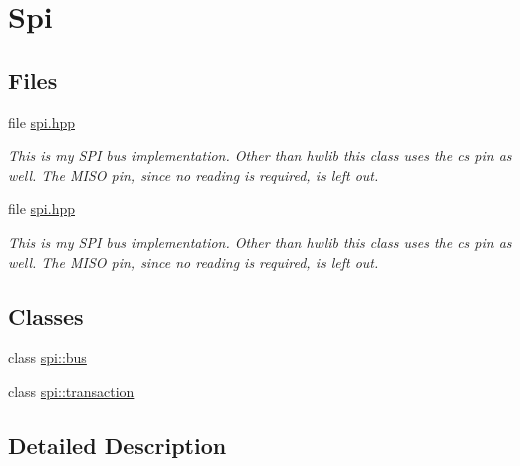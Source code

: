 \hypertarget{group__spi}{}\section{Spi}
\label{group__spi}
\subsection*{Files}
\begin{DoxyCompactItemize}
\item 
file \hyperlink{spi_8hpp}{spi.\+hpp}
\begin{DoxyCompactList}\small\item\em This is my S\+PI bus implementation. Other than hwlib this class uses the cs pin as well. The M\+I\+SO pin, since no reading is required, is left out. \end{DoxyCompactList}\item 
file \hyperlink{spi_8hpp}{spi.\+hpp}
\begin{DoxyCompactList}\small\item\em This is my S\+PI bus implementation. Other than hwlib this class uses the cs pin as well. The M\+I\+SO pin, since no reading is required, is left out. \end{DoxyCompactList}\end{DoxyCompactItemize}
\subsection*{Classes}
\begin{DoxyCompactItemize}
\item 
class \hyperlink{classspi_1_1bus}{spi\+::bus}
\item 
class \hyperlink{classspi_1_1transaction}{spi\+::transaction}
\end{DoxyCompactItemize}


\subsection{Detailed Description}
